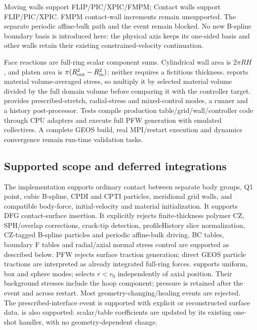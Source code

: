 Moving walls support FLIP/PIC/XPIC/FMPM; Contact walls support FLIP/PIC/XPIC.
FMPM contact-wall increments remain unsupported. The separate
 periodic affine-bulk path and the
 event remain blocked. No new B-spline boundary
basis is introduced here: the physical axis keeps its one-sided basis and
other walls retain their existing constrained-velocity continuation.

Face reactions are full-ring scalar component sums. Cylindrical wall area is
$2\pi R H$, and platen area is $\pi(R_{\rm out}^2-R_{\rm in}^2)$; neither
requires a fictitious thickness.  reports material
volume-averaged stress, so multiply it by selected material volume divided by
the full domain volume before comparing it with the controller target.
 provides prescribed-stretch,
radial-stress and mixed-control modes, a runner and a history post-processor.
Tests compile production table/grid/wall/controller code through CPU adapters
and execute full PFW generation with emulated collectives. A complete GEOS
build, real MPI/restart execution and dynamics convergence remain run-time
validation tasks.

\subsection{Supported scope and deferred integrations}
The implementation supports ordinary contact between separate body groups,
Q1 point, cubic B-spline, CPDI and CPTI particles, meridional grid walls, and
compatible body-force, initial-velocity and material initialization.
It supports DFG contact-surface insertion. It explicitly rejects finite-thickness
polymer CZ, SPH/overlap corrections, crack-tip detection, profileHistory slice normalization,
CZ-tagged B-spline particles and periodic affine-bulk driving.
BC tables, boundary F tables and radial/axial normal stress control are supported
as described below. PFW rejects surface traction generation;
direct GEOS particle tractions are interpreted as already integrated full-ring
forces.  supports uniform, box and sphere modes;
 selects $r<r_0$ independently of axial position.
Their background stresses include the hoop component; pressure is retained
after the event and across restart. Most geometry-changing/healing events are rejected. The prescribed-interface
 event is supported with explicit or reconstructed surface data.
 is also supported: scalar/table coefficients
are updated by its existing one-shot handler, with no geometry-dependent change.

